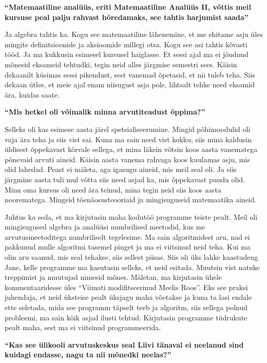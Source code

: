 \textbf{\enquote{Matemaatiline analüüs, eriti Matemaatiline Analüüs II, võttis meil kursuse peal palju rahvast hõredamaks, see tahtis harjumist saada}}

Ja algebra tahtis ka. Kogu see matemaatiline lähenemine, et me ehitame asju üles mingite definitsioonide ja aksioomide millegi otsa. Kogu see asi tahtis kõvasti tööd. Ja ma kukkusin esimesel kursusel haiglasse. Et sessi ajal ma ei jõudnud mõnesid eksameid tehtudki, tegin neid alles järgmise semestri sees. Käisin dekaanilt küsimas sessi pikendust, sest vanemad õpetasid, et nii tuleb teha. Siis dekaan ütles, et meie ajal enam niisugust asja pole, lihtsalt tehke need eksamid ära, kuidas saate. 

\textbf{\enquote{Mis hetkel oli võimalik minna arvutiteadust õppima?}} 

Selleks oli kas esimese aasta järel spetsialiseerumine. Mingid põhimoodulid oli vaja ära teha ja siis vist sai. Kuna ma sain need vist kokku, siis mina kaldusin üldisest õppekavast kõrvale sellega, et mina läksin võtsin koos aasta vanematega põnevaid arvuti aineid. Käisin aasta vanema rahvaga koos kuulamas asju, mis olid lahedad. Peast ei mäleta, aga igasugu aineid, mis meil seal oli. Ja siis järgmine aasta tuli mul võtta siis need asjad ka, mis õppekavast puudu olid. Minu oma kursus oli need ära teinud, mina tegin neid siis koos aasta noorematega. Mingeid tõenäosusteooriaid ja mingisuguseid matemaatika aineid. 

Juhtus ka seda, et ma kirjutasin maha kodutöö programme teiste pealt. Meil oli mingisugused algebra ja analüüsi numbrilised meetodid, kus me arvutusmeetoditega numbriliselt tegelesime. Ma sain algoritmidest aru, nad ei pakkunud mulle algoritmi tasemel pinget ja ma ei viitsinud neid teha. Kui ma olin aru saanud, mis seal tehakse, siis sellest piisas. Siis oli üks lahke kaastudeng Jane, kelle programme ma kasutasin selleks, et neid esitada. Muutsin vist natuke treppimist ja muutujad nimesid mõnes. Mäletan, ma kirjutasin ühele kommentaaridesse üles \enquote{Viimati modifitseerinud Meelis Roos}. Eks see praksi juhendaja, et neid üksteise pealt üksjagu maha võetakse ja kuna ta lasi endale ette seletada, mida see programm täpselt teeb ja algoritm, siis sellega polnud probleemi, ma sain kõik asjad ilusti tehtud. Kirjutasin programme tüdrukute pealt maha, sest ma ei viitsinud programmeerida. 

\textbf{\enquote{Kas see ülikooli arvutuskeskus seal Liivi tänaval ei neelanud sind kuidagi endasse, nagu ta nii mõnedki neelas?}} 

